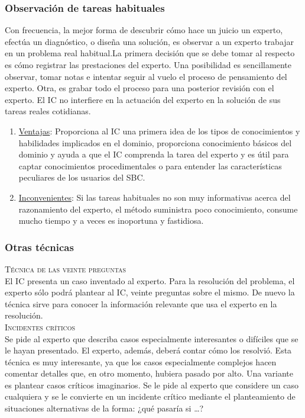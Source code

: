 \documentclass[12pt]{article}
\begin{document}
\subsubsection{Observación de tareas habituales}
Con frecuencia, la mejor forma de descubrir cómo hace un juicio un experto, efectúa un diagnóstico, o diseña una solución, es observar a un experto trabajar en un problema real habitual.La primera decisión que se debe tomar al respecto es cómo registrar las prestaciones del experto. Una posibilidad es sencillamente observar, tomar notas e intentar seguir al vuelo el proceso de pensamiento del experto. Otra, es grabar todo el proceso para una posterior revisión con el experto. El IC no interfiere en la actuación del experto en la solución de sus tareas reales cotidianas.
\begin{enumerate}
\item \underline{Ventajas}: Proporciona al IC una primera idea de los tipos de conocimientos y habilidades implicados en el dominio, proporciona conocimiento básicos del dominio y ayuda a que el IC comprenda la tarea del experto y es útil para captar conocimientos procedimentales o para entender las características peculiares de los usuarios del SBC.
\item \underline{Inconvenientes}: Si las tareas habituales no son muy informativas acerca del razonamiento del experto, el método suministra poco conocimiento, consume mucho tiempo y a veces es inoportuna y fastidiosa.
\end{enumerate}

\subsubsection{Otras técnicas}
\textsc{Técnica de las veinte preguntas}\\
El IC presenta un caso inventado al experto. Para la resolución del problema, el experto sólo podrá plantear al IC, veinte preguntas sobre el mismo. De nuevo la técnica sirve para conocer la información relevante que usa el experto en la resolución.\\

\textsc{Incidentes críticos}\\
Se pide al experto que describa casos especialmente interesantes o difíciles que se le hayan presentado. El experto, además, deberá contar cómo los resolvió. Esta técnica es muy interesante, ya que los casos especialmente complejos hacen comentar detalles que, en otro momento, hubiera pasado por alto. Una variante es plantear casos críticos imaginarios. Se le pide al experto que considere un caso cualquiera y se le convierte en un incidente crítico mediante el planteamiento de situaciones alternativas de la forma: ¿qué pasaría si …?\\
\end{document}
